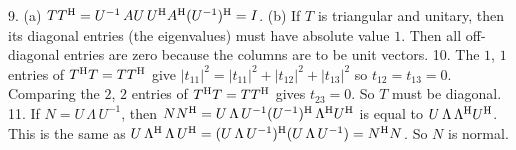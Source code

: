 9. (a) \(TT^{\rm H}=U^{-1}\,AU\,U^{\rm H}A^{\rm H}(U^{-1})^{\rm H}=I\). (b) If \(T\) is triangular and unitary, then its diagonal entries (the eigenvalues) must have absolute value \(1\). Then all off-diagonal entries are zero because the columns are to be unit vectors.
10. The \(1\), \(1\) entries of \(T^{\rm H}T=TT^{\rm H}\) give \(|t_{11}|^{2}=|t_{11}|^{2}+|t_{12}|^{2}+|t_{13}|^{2}\) so \(t_{12}=t_{13}=0\). Comparing the \(2\), \(2\) entries of \(T^{\rm H}T=TT^{\rm H}\) gives \(t_{23}=0\). So \(T\) must be diagonal.
11. If \(N=U\,\Lambda\,U^{-1}\), then \(NN^{\rm H}=U\,\Lambda\,U^{-1}(U^{-1})^{\rm H}\,\Lambda^{\rm H}U^{\rm H}\) is equal to \(U\,\Lambda\,\Lambda^{\rm H}U^{\rm H}\). This is the same as \(U\,\Lambda^{\rm H}\,\Lambda\,U^{\rm H}=(U\,\Lambda\,U^{-1})^{\rm H}(U\,\Lambda\,U ^{-1})=N^{\rm H}N\). So \(N\) is normal.

 